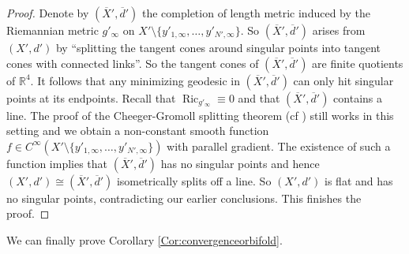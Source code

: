 \documentclass[11pt]{amsart}
\numberwithin{equation}{section}
\newcommand{\IR}{\mathbb{R}}
\DeclareMathOperator{\Ric}{Ric}
\numberwithin{equation}{section}
\begin{document}
\begin{proof}
Denote by $(\overline{X}', \overline{d}')$ the completion of length metric induced by the Riemannian metric $g'_\infty$ on $X' \setminus \{ y'_{1, \infty}, \ldots, y'_{N', \infty} \}$.
So $(\overline{X}', \overline{d}')$ arises from $(X', d')$ by ``splitting the tangent cones around singular points into tangent cones with connected links''.
So the tangent cones of $(\overline{X}', \overline{d}')$ are finite quotients of $\IR^4$.
It follows that any minimizing geodesic in $(\overline{X}', \overline{d}')$ can only hit singular points at its endpoints.
Recall that $\Ric_{g'_\infty} \equiv 0$ and that $(\overline{X}', \overline{d}')$ contains a line.
The proof of the Cheeger-Gromoll splitting theorem (cf \cite{CG}) still works in this setting and we obtain a non-constant smooth function $f \in C^\infty (X' \setminus \{ y'_{1, \infty}, \ldots, y'_{N', \infty} \})$ with parallel gradient.
The existence of such a function implies that $(\overline{X}', \overline{d}')$ has no singular points and hence $(X', d') \cong (\overline{X}', \overline{d}')$ isometrically splits off a line.
So $(X', d')$ is flat and has no singular points, contradicting our earlier conclusions.
This finishes the proof.
\end{proof}

We can finally prove Corollary \ref{Cor:convergenceorbifold}.
\end{document}
